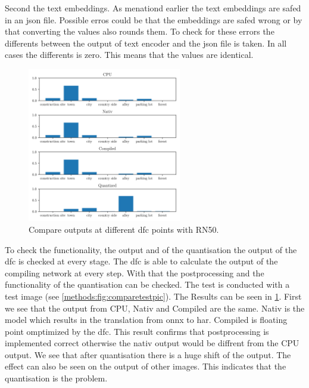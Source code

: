 Second the text embeddings.
As menationd earlier the text embeddings are safed in an json file.
Possible erros could be that the embeddings are safed wrong or by that converting the values also rounds them.
To check for these errors the differents between the output of text encoder and the json file is taken.
In all cases the differents is zero.
This means that the values are identical.

\begin{figure}[h]
    \centering
    \includegraphics[width=0.6\textwidth]{Images/Implementation/compareProbs_RN50.png}
    \caption{Compare outputs at different \acrshort{dfc} points with RN50.}
    \label{methods:fig:comparern50}
\end{figure}

To check the functionality, the output and of the quantisation the output of the \acrshort{dfc} is checked at every stage.
The \acrshort{dfc} is able to calculate the output of the compiling network at every step.
With that the postprocessing and the functionality of the quantisation can be checked.
The test is conducted with a test image (see \cref{methods:fig:comparetestpic}).
The Results can be seen in \cref{methods:fig:comparern50}.
First we see that the output from CPU, Nativ and Compiled are the same.
Nativ is the model which results in the translation from onnx to \acrshort{har}.
Compiled is floating point omptimized by the \acrshort{dfc}.
This result confirms that postprocessing is implemented correct otherwise the nativ output would be diffrent from the CPU output.
We see that after quantisation there is a huge shift of the output.
The effect can also be seen on the output of other images.
This indicates that the quantisation is the problem.

